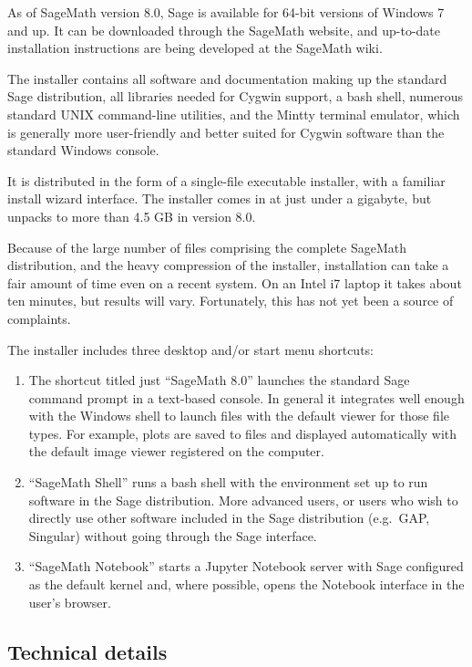 As of SageMath version 8.0, Sage is available for 64-bit versions of
Windows 7 and up. It can be downloaded through the SageMath website, and
up-to-date installation instructions are being developed at the SageMath
wiki.

The installer contains all software and documentation making up the
standard Sage distribution, all libraries needed for Cygwin support, a
bash shell, numerous standard UNIX command-line utilities, and the
Mintty terminal emulator, which is generally more user-friendly and
better suited for Cygwin software than the standard Windows console.

It is distributed in the form of a single-file executable installer,
with a familiar install wizard interface. The installer comes in at just
under a gigabyte, but unpacks to more than 4.5 GB in version 8.0.

Because of the large number of files comprising the complete SageMath
distribution, and the heavy compression of the installer, installation
can take a fair amount of time even on a recent system. On an Intel i7
laptop it takes about ten minutes, but results will vary. Fortunately,
this has not yet been a source of complaints.

The installer includes three desktop and/or start menu shortcuts:

\begin{enumerate}
\def\labelenumi{\arabic{enumi}.}
\item
  The shortcut titled just ``SageMath 8.0'' launches the standard Sage
  command prompt in a text-based console. In general it integrates well
  enough with the Windows shell to launch files with the default viewer
  for those file types. For example, plots are saved to files and
  displayed automatically with the default image viewer registered on
  the computer.
\item
  ``SageMath Shell'' runs a bash shell with the environment set up to
  run software in the Sage distribution. More advanced users, or users
  who wish to directly use other software included in the Sage
  distribution (e.g.~GAP, Singular) without going through the Sage
  interface.
\item
  ``SageMath Notebook'' starts a Jupyter Notebook server with Sage
  configured as the default kernel and, where possible, opens the
  Notebook interface in the user's browser.
\end{enumerate}

\hypertarget{technical-details}{%
\subsection{Technical details}\label{technical-details}}

